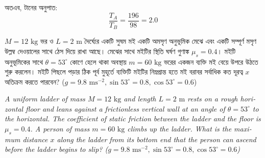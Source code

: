 \documentclass[12pt, a4paper]{article}
\begin{document}
{{\begin{tcolorbox}[solutionbox={সমাধান (Solution)}]
    অতএব, টানের অনুপাত:
    \[ \frac{T_A}{T_B} = \frac{196}{98} = \mathbf{2.0} \]
\end{tcolorbox}

\newpage

\begin{tcolorbox}[questionbox={প্রশ্ন (Question) 46}]
    \noindent
    $M = 12\text{ kg}$ ভর ও $L = 2\text{ m}$ দৈর্ঘ্যের একটি সুষম মই একটি অমসৃণ অনুভূমিক মেঝে এবং একটি সম্পূর্ণ মসৃণ উল্লম্ব দেওয়ালের সাথে ঠেস দিয়ে রাখা আছে। মেঝের সাথে মইটির স্থিতি ঘর্ষণ গুণাঙ্ক $\mu_s = 0.4$। মইটি অনুভূমিকের সাথে $\theta = 53^\circ$ কোণে হেলে থাকা অবস্থায় $m = 60\text{ kg}$ ভরের একজন ব্যক্তি মই বেয়ে উপরে উঠতে শুরু করলেন। মইটি পিছলে পড়ার ঠিক পূর্ব মুহূর্তে ব্যক্তিটি মইটির নিম্নপ্রান্ত হতে মই বরাবর সর্বাধিক কত দূরত্ব $x$ অতিক্রম করতে পারবেন? ($g = 9.8\text{ ms}^{-2}, \sin 53^\circ = 0.8, \cos 53^\circ = 0.6$)
    
    \vspace{0.8em}
    \begin{english}
    \noindent\textit{\color{darkgray}
    A uniform ladder of mass $M = 12\text{ kg}$ and length $L = 2\text{ m}$ rests on a rough horizontal floor and leans against a frictionless vertical wall at an angle of $\theta = 53^\circ$ to the horizontal. The coefficient of static friction between the ladder and the floor is $\mu_s = 0.4$. A person of mass $m = 60\text{ kg}$ climbs up the ladder. What is the maximum distance $x$ along the ladder from its bottom end that the person can ascend before the ladder begins to slip? ($g = 9.8\text{ ms}^{-2}, \sin 53^\circ = 0.8, \cos 53^\circ = 0.6$)
    }
    \end{english}
\end{tcolorbox}

\vspace{1em}
\begin{center}
\end{center}}}
\end{document}
